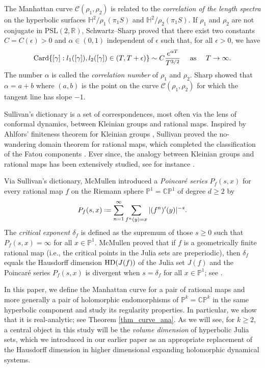\documentclass[11pt]{amsart}
\theoremstyle{plain}
\theoremstyle{definition}
\theoremstyle{remark}
\newcommand{\bbC}{\mathbb{C}} %
\newcommand{\bbP}{\mathbb{P}}
\newcommand{\PSL}{\text{PSL}}
\newcommand*{\defeq}{\mathrel{\vcenter{\baselineskip0.5ex \lineskiplimit0pt
			\hbox{\scriptsize.}\hbox{\scriptsize.}}}%
	=}
\begin{document}
The Manhattan curve $\mathcal{C}(\rho_1,\rho_2)$ is related to the \emph{correlation of 
the length
spectra}
on the hyperbolic surfaces $\mathbb{H}^2/\rho_1(\pi_1S)$ and $\mathbb{H}^2/\rho_2(\pi_1S)$. If $\rho_1$ and $\rho_2$ are not conjugate in $\PSL(2,\mathbb{R})$, Schwartz--Sharp
\cite{SchwartzSharp93}
proved that there exist  two
constants $C = C(\epsilon)>0$ and $\alpha \in (0,1)$ independent of $\epsilon$ such that, for all $\epsilon>0$, we have
\begin{equation}\label{eq:intro-2}
{\rm Card}\{[\gamma] : l_1([\gamma]),l_2([\gamma]) \in (T,T+\epsilon) \} \sim C\frac{e^{\alpha T}}{T^{3/2}} 
\quad \text{ as } 
\quad T \to \infty.
\end{equation}
The number $\alpha$ is called the {\it correlation number}
of $\rho_1$ and $\rho_2$.
Sharp \cite{Sharp98}
showed that $\alpha = a+b$ where $(a,b)$ is the point on the curve $\mathcal{C}(\rho_1,\rho_2)$ for which the tangent line has slope $-1$.

\medskip

Sullivan's dictionary is a set of correspondences,
most often via the lens of
conformal dynamics, between Kleinian groups and rational maps.
Inspired by Ahlfors’ finiteness theorem for Kleinian groups \cite{Ahlfors64}, Sullivan proved the no-wandering domain theorem for rational maps,
which completed the classification of the Fatou components \cite{Sullivan85}. Ever since, the analogy between Kleinian groups and rational maps has been extensively studied, see for instance
\cite{Luo_GeoFiniteDegenI,LLM24,McM_RibbonRtreeHoloDyn,McM_CompExpCircle}.

Via Sullivan's dictionary, McMullen
\cite{McMullen00}
introduced a {\it Poincar\'e series}
$P_f(s,x)$
for every
rational map $f$ on the Riemann sphere $\mathbb{P}^1= \mathbb C\mathbb{P}^1$ of degree $d\geq 2$ by
$$P_f(s,x) \defeq \sum_{n=1}^\infty \sum_{f^n(y)=x}|(f^n)'(y)|^{-s}.$$
The {\it critical exponent $\delta_f$} is defined as the supremum of those $s \ge 0$ such that $P_f(s,x) = \infty$ for all $x \in \bbP^1$. McMullen proved that if $f$ is a geometrically finite rational map (i.e., the critical points in the Julia sets are preperiodic), then $\delta_f$ equals the Hausdorff dimension ${\rm HD}(J(f))$
of the Julia set $J(f)$ and the Poincar\'e series $P_f(s,x)$ is divergent when $s = \delta_f$ for all $x \in \bbP^1$; see \cite[Theorem 1.2]{McMullen00}.

\medskip

In this paper, we define the Manhattan curve for a pair of rational maps and more generally a pair of
holomorphic endomorphisms of $\mathbb{P}^k = \bbC\bbP^k$
in the same hyperbolic component and study its regularity properties. In particular, we show that it is real-analytic; see Theorem \ref{thm_curve_ana}. 
As we will see, 
for
$k\geq 2$,
a central object in this study will be  
the {\it volume dimension} of hyperbolic Julia sets, which we introduced in our earlier paper \cite{BHMane} as an appropriate replacement of the Hausdorff dimension in higher dimensional expanding holomorphic dynamical systems. 
\end{document}
